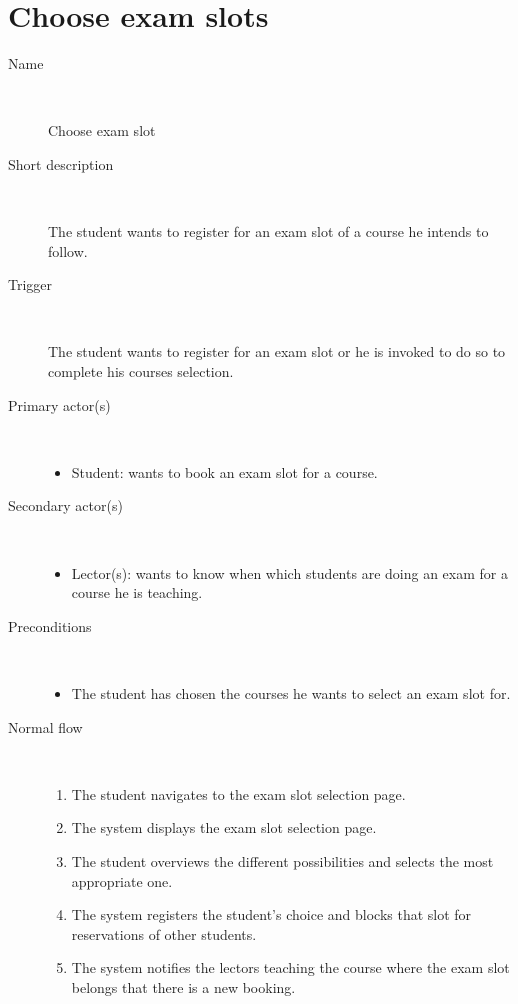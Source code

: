 \section{Choose exam slots}

\begin{description}
	\item[Name] \
		\par Choose exam slot
	\item[Short description] \ 
			\par The student wants to register for an exam slot of a course he intends to
			follow.
	\item[Trigger] \ 
			\par The student wants to register for an exam slot or he is invoked to do so
			to complete his courses selection.
	\item[Primary actor(s)] \ 
		\begin{itemize}
		  \item Student: wants to book an exam slot for a course.
		\end{itemize}
	\item[Secondary actor(s)] \ 
		\begin{itemize}
		  \item Lector(s): wants to know when which students are doing an exam for
		  a course he is teaching.
		\end{itemize}
	\item[Preconditions] \ 
	\begin{itemize}
		\item The student has chosen the courses he wants to select an exam
		slot for.
	\end{itemize}
	\item[Normal flow] \ 
	\begin{enumerate}
	  	\item The student navigates to the exam slot selection page.
	  	\item The system displays the exam slot selection page.
	  	\item The student overviews the different possibilities and selects the most
	  	appropriate one.
	  	\item The system registers the student's choice and blocks that slot for
	  	reservations of other students.
	  	\item The system notifies the lectors teaching the course where the exam
	  	slot belongs that there is a new booking.
	\end{enumerate}

\end{description}
